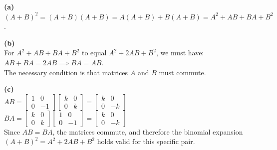 \begin{solution}
\textbf{(a)} \\
$(A+B)^2 = (A+B)(A+B) = A(A+B) + B(A+B) = A^2 + AB + BA + B^2$.

\medskip
\textbf{(b)} \\
For $A^2 + AB + BA + B^2$ to equal $A^2 + 2AB + B^2$, we must have: \\
$AB + BA = 2AB \implies BA = AB$. \\
The necessary condition is that matrices $A$ and $B$ must commute.

\medskip
\textbf{(c)} \\
$AB = \begin{bmatrix} 1 & 0 \\ 0 & -1 \end{bmatrix} \begin{bmatrix} k & 0 \\ 0 & k \end{bmatrix} = \begin{bmatrix} k & 0 \\ 0 & -k \end{bmatrix}$ \\
$BA = \begin{bmatrix} k & 0 \\ 0 & k \end{bmatrix} \begin{bmatrix} 1 & 0 \\ 0 & -1 \end{bmatrix} = \begin{bmatrix} k & 0 \\ 0 & -k \end{bmatrix}$ \\
Since $AB = BA$, the matrices commute, and therefore the binomial expansion $(A+B)^2 = A^2 + 2AB + B^2$ holds valid for this specific pair.


\end{solution}
